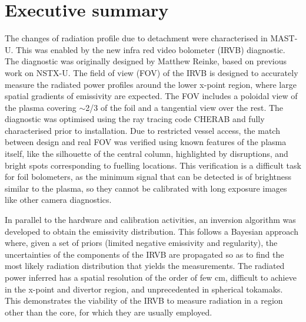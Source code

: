 \documentclass[]{yorkThesis}  %
\begin{document}

\chapter*{Executive summary}


The changes of radiation profile due to detachment were characterised in MAST-U. This was enabled by the new infra red video bolometer (IRVB) diagnostic. The diagnostic was originally designed by Matthew Reinke, based on previous work on NSTX-U.\cite{VanEden2016} %
The field of view (FOV) of the IRVB is designed to accurately measure the radiated power profiles around the lower x-point region, where large spatial gradients of emissivity are expected. The FOV includes a poloidal view of the plasma covering $\sim$2/3 of the foil and a tangential view over the rest. The diagnostic was optimised using the ray tracing code CHERAB and fully characterised prior to installation. Due to restricted vessel access, the match between design and real FOV was verified using known features of the plasma itself, like the silhouette of the central column, highlighted by disruptions, and bright spots corresponding to fuelling locations. This verification is a difficult task for foil bolometers, as the minimum signal that can be detected is of brightness similar to the plasma, so they cannot be calibrated with long exposure images like other camera diagnostics.

In parallel to the hardware and calibration activities, an inversion algorithm was developed to obtain the emissivity distribution. This follows a Bayesian approach where, given a set of priors (limited negative emissivity and regularity), the uncertainties of the components of the IRVB are propagated so as to find the most likely radiation distribution that yields the measurements. The radiated power inferred has a spatial resolution of the order of few cm, difficult to achieve in the x-point and divertor region, and unprecedented in spherical tokamaks. This demonstrates the viability of the IRVB to measure radiation in a region other than the core, for which they are usually employed.
\end{document}

